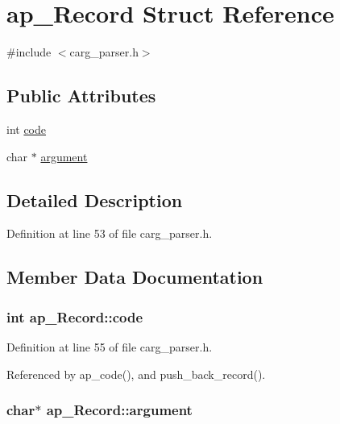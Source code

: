 \hypertarget{structap__Record}{
\section{ap\_\-Record Struct Reference}
\label{de/d1b/structap__Record}
}


{\ttfamily \#include $<$carg\_\-parser.h$>$}

\subsection*{Public Attributes}
\begin{DoxyCompactItemize}
\item 
int \hyperlink{structap__Record_a90b6ee4e2136696628a563773e8f8d87}{code}
\item 
char $\ast$ \hyperlink{structap__Record_ab93310b61c3c13ad00b76d170f47ff9e}{argument}
\end{DoxyCompactItemize}


\subsection{Detailed Description}


Definition at line 53 of file carg\_\-parser.h.



\subsection{Member Data Documentation}
\hypertarget{structap__Record_a90b6ee4e2136696628a563773e8f8d87}{
\subsubsection[{code}]{\setlength{\rightskip}{0pt plus 5cm}int {\bf ap\_\-Record::code}}}
\label{de/d1b/structap__Record_a90b6ee4e2136696628a563773e8f8d87}


Definition at line 55 of file carg\_\-parser.h.



Referenced by ap\_\-code(), and push\_\-back\_\-record().

\hypertarget{structap__Record_ab93310b61c3c13ad00b76d170f47ff9e}{
\subsubsection[{argument}]{\setlength{\rightskip}{0pt plus 5cm}char$\ast$ {\bf ap\_\-Record::argument}}}
\label{de/d1b/structap__Record_ab93310b61c3c13ad00b76d170f47ff9e}


